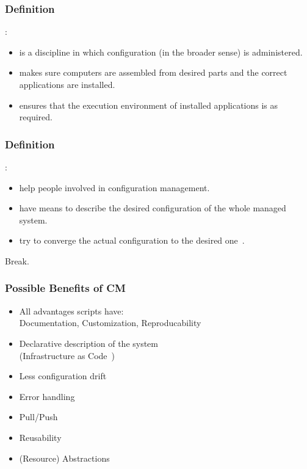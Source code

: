 \begin{frame}
	\frametitle{Definition}

	:

	\pause

	\begin{itemize}
	\item is a discipline in which configuration (in the broader sense) is administered.
	\item makes sure computers are assembled from desired parts and the correct applications are installed.
	\item ensures that the execution environment of installed applications is as required.
	\end{itemize}
\end{frame}


\begin{frame}
	\frametitle{Definition}

	:

	\pause

	\begin{itemize}
	\item help people involved in configuration management.
	\item have means to describe the desired configuration of the whole managed system.
	\item try to converge the actual configuration to the desired one~\cite{burgess1995cfengine}.
	\end{itemize}
\end{frame}

\begin{assignment}
	\begin{task}
	Break.
	\end{task}
\end{assignment}

\begin{frame}
	\frametitle{Possible Benefits of CM}

	\pause

	\begin{itemize} %
	\item All advantages scripts have: \\
		Documentation, Customization, Reproducability
	\item Declarative description of the system \\
		(Infrastructure as Code~\cite{waldemar2013testing})
	\item Less configuration drift
	\item Error handling
	\item Pull/Push
	\item Reusability
	\item (Resource) Abstractions
	\end{itemize}
\end{frame}

